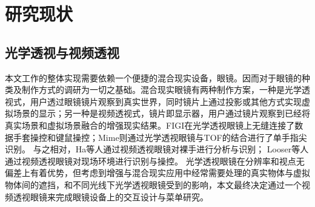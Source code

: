 \section{研究现状}
\label{sec:related-cur}
\subsection{光学透视与视频透视}
\label{sec:related-vst}
本文工作的整体实现需要依赖一个便捷的混合现实设备，眼镜。因而对于眼镜的种类及制作方式的调研为一切之基础。混合现实眼镜有两种制作方案，一种是光学透视式，用户透过眼镜镜片观察到真实世界，同时镜片上通过投影或其他方式实现虚拟场景的显示；另一种是视频透视式，镜片即显示器，用户通过镜片观察到已经将真实场景和虚拟场景融合的增强现实结果。FIGI在光学透视眼镜上无缝连接了数据手套操控和键鼠操控；Mime则通过光学透视眼镜与TOF的结合进行了单手指尖识别。
与之相对，Ha等人通过视频透视眼镜对裸手进行分析与识别；
Looser等人通过视频透视眼镜对现场环境进行识别与操控。
光学透视眼镜在分辨率和视点无偏差上有着优势，但考虑到增强与混合现实应用中经常需要处理的真实物体与虚拟物体间的遮挡，和不同光线下光学透视眼镜受到的影响，本文最终决定通过一个视频透视眼镜来完成眼镜设备上的交互设计与菜单研究。

